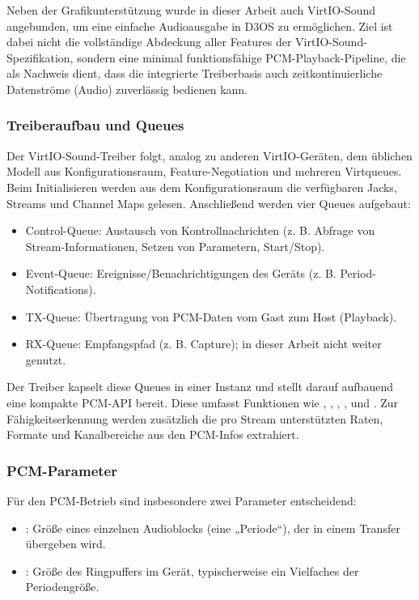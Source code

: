 Neben der Grafikunterstützung wurde in dieser Arbeit auch VirtIO-Sound angebunden, um eine einfache Audioausgabe in D3OS zu ermöglichen. Ziel ist dabei nicht die vollständige Abdeckung aller Features der VirtIO-Sound-Spezifikation, sondern eine minimal funktionsfähige PCM-Playback-Pipeline, die als Nachweis dient, dass die integrierte Treiberbasis auch zeitkontinuierliche Datenströme (Audio) zuverlässig bedienen kann.

\subsubsection{Treiberaufbau und Queues}

Der VirtIO-Sound-Treiber folgt, analog zu anderen VirtIO-Geräten, dem üblichen Modell aus Konfigurationsraum, Feature-Negotiation und mehreren Virtqueues. Beim Initialisieren werden aus dem Konfigurationsraum die verfügbaren Jacks, Streams und Channel Maps gelesen. Anschließend werden vier Queues aufgebaut:

\begin{itemize}
 \item Control-Queue: Austausch von Kontrollnachrichten (z. B. Abfrage von Stream-Informationen, Setzen von Parametern, Start/Stop).
 \item Event-Queue: Ereignisse/Benachrichtigungen des Geräts (z. B. Period-Notifications).
 \item TX-Queue: Übertragung von PCM-Daten vom Gast zum Host (Playback).
 \item RX-Queue: Empfangspfad (z. B. Capture); in dieser Arbeit nicht weiter genutzt.
\end{itemize}

Der Treiber kapselt diese Queues in einer Instanz und stellt darauf aufbauend eine kompakte PCM-API bereit. Diese umfasst Funktionen wie , , , ,  und . Zur Fähigkeitserkennung werden zusätzlich die pro Stream unterstützten Raten, Formate und Kanalbereiche aus den PCM-Infos extrahiert.\\

\subsubsection{PCM-Parameter}

Für den PCM-Betrieb sind insbesondere zwei Parameter entscheidend:

\begin{itemize}
 \item {}: Größe eines einzelnen Audioblocks (eine „Periode“), der in einem Transfer übergeben wird.
 \item {}: Größe des Ringpuffers im Gerät, typischerweise ein Vielfaches der Periodengröße.
\end{itemize}

